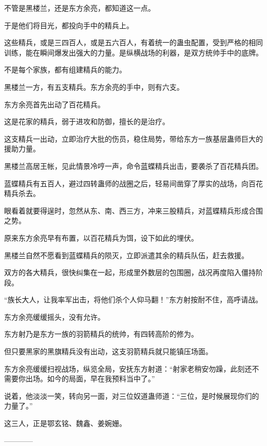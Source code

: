 \begin{this_body}
不管是黑楼兰，还是东方余亮，都知道这一点。

于是他们将目光，都投向手中的精兵上。

这些精兵，或是三四百人，或是五六百人，有着统一的蛊虫配置，受到严格的相同训练，能在瞬间爆发出强大的力量。是纵横战场的利器，是双方统帅手中的底牌。

不是每个家族，都有组建精兵的能力。

黑楼兰一方，有五支精兵。东方余亮的手中，则有六支。

东方余亮首先出动了百花精兵。

这是花家的精兵，弱于进攻和防御，擅长的是治疗。

这支精兵一出动，立即治疗大批的伤员，稳住局势，带给东方一族基层蛊师巨大的援助力量。

黑楼兰高居王帐，见此情景冷哼一声，命令蓝蝶精兵出击，要袭杀了百花精兵团。

蓝蝶精兵有五百人，避过四转蛊师的战圈之后，轻易间凿穿了厚实的战场，向百花精兵杀去。

眼看着就要得逞时，忽然从东、南、西三方，冲来三股精兵，对蓝蝶精兵形成合围之势。

原来东方余亮早有布置，以百花精兵为饵，设下如此的埋伏。

黑楼兰自然不愿看到蓝蝶精兵的陨灭，立即派遣其余的精兵队伍，赶去救援。

双方的各大精兵，很快纠集在一起，形成里外数层的包围圈，战况再度陷入僵持阶段。

“族长大人，让我率军出击，将他们杀个人仰马翻！”东方射按耐不住，高呼请战。

东方余亮缓缓摇头，没有允许。

东方射乃是东方一族的羽箭精兵的统帅，有四转高阶的修为。

但只要黑家的黑旗精兵没有出动，这支羽箭精兵就只能镇压场面。

东方余亮缓缓扫视战场，纵览全局，安抚东方射道：“射家老稍安勿躁，此刻还不需要你出场。如今的局面，早在我预料当中了。”

说着，他淡淡一笑，转向另一面，对三位奴道蛊师道：“三位，是时候展现你们的力量了。”

这三人，正是鄂玄铭、魏鑫、姜婉姗。

------------

\end{this_body}

